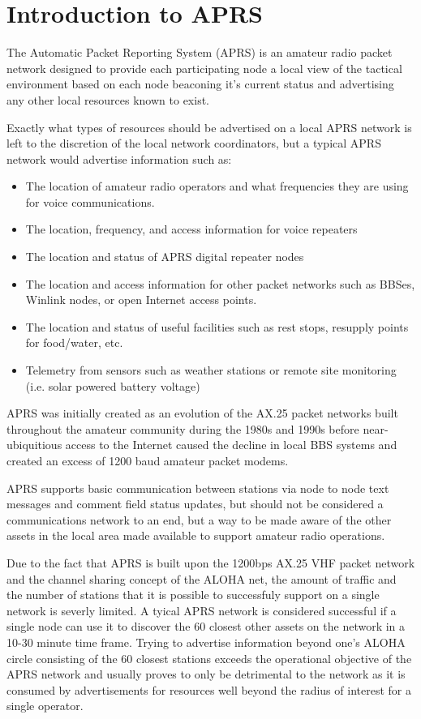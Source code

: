 \chapter{Introduction to APRS}

The Automatic Packet Reporting System (APRS) is an amateur radio packet
network designed to provide each participating node a local view of the 
tactical environment based on each node beaconing it's current status
and advertising any other local resources known to exist.

Exactly what types of resources should be advertised on a local APRS
network is left to the discretion of the local network coordinators, but
a typical APRS network would advertise information such as:
\begin{itemize}
\item The location of amateur radio operators and what frequencies they are using for voice communications.
\item The location, frequency, and access information for voice repeaters
\item The location and status of APRS digital repeater nodes
\item The location and access information for other packet networks such as BBSes, Winlink nodes, or open Internet access points.
\item The location and status of useful facilities such as rest stops, resupply points for food/water, etc.
\item Telemetry from sensors such as weather stations or remote site monitoring (i.e. solar powered battery voltage)
\end{itemize} 

APRS was initially created as an evolution of the AX.25 packet networks
built throughout the amateur community during the 1980s and 1990s before 
near-ubiquitious access to the Internet caused the decline in local BBS 
systems and created an excess of 1200 baud amateur packet modems.

APRS supports basic communication between stations via node to node 
text messages and comment field status updates, but should not be 
considered a communications network to an end, but a way to be made aware
of the other assets in the local area made available to support amateur 
radio operations.


Due to the fact that APRS is built upon the 1200bps AX.25 VHF packet
network and the channel sharing concept of the ALOHA net, the amount of 
traffic and the number of stations that it is possible to successfuly 
support on a single network is severly limited. A tyical APRS network 
is considered successful if a single node
can use it to discover the 60 closest other assets on the network in a
10-30 minute time frame. Trying to advertise information beyond one's
ALOHA circle consisting of the 60 closest stations exceeds the 
operational objective of the APRS network and usually proves to only be 
detrimental to the network as it is consumed by advertisements for 
resources well beyond the radius of interest for a single operator.
